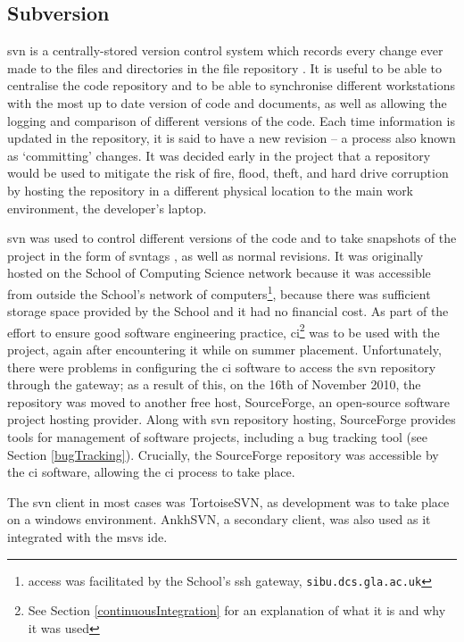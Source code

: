 \documentclass{l4proj}
\begin{document}
\subsection{Subversion}
\label{svn}
\gls{svn} is a centrally-stored version control system which records every change ever made to the files and directories in the file repository \cite{CFP04c1}.  It is useful to be able to centralise the code repository and to be able to synchronise different workstations with the most up to date version of code and documents, as well as allowing the logging and comparison of different versions of the code.  Each time information is updated in the repository, it is said to have a new revision -- a process also known as `committing' changes.  It was decided early in the project that a repository would be used to mitigate the risk of fire, flood, theft, and hard drive corruption by hosting the repository in a different physical location to the main work environment, the developer's laptop.  

\gls{svn} was used to control different versions of the code and to take snapshots of the project in the form of \gls{svntag}s \cite{CFP04c4}, as well as normal revisions.  It was originally hosted on the School of Computing Science network because it was accessible from outside the School's network of computers\footnote{access was facilitated by the School's \gls{ssh} gateway, \texttt{sibu.dcs.gla.ac.uk}}, because there was sufficient storage space provided by the School and it had no financial cost.  As part of the effort to ensure good software engineering practice, \gls{ci}\footnote{See Section \ref{continuousIntegration} for an explanation of what it is and why it was used} was to be used with the project, again after encountering it while on summer placement.  Unfortunately, there were problems in configuring the  \gls{ci}  software to access the \gls{svn} repository through the gateway; as a result of this, on the 16\^{th} of November 2010, the repository was moved to another free host, SourceForge, an open-source software project hosting provider.  Along with \gls{svn} repository hosting, SourceForge provides tools for management of software projects, including a bug tracking tool (see Section \ref{bugTracking}).  Crucially, the SourceForge repository was accessible by the \gls{ci} software, allowing the \gls{ci} process to take place.

The \gls{svn} client in most cases was TortoiseSVN, as development was to take place on a windows environment.  AnkhSVN, a secondary client, was also used as it integrated with the \gls{msvs} \gls{ide}. 
\end{document}

